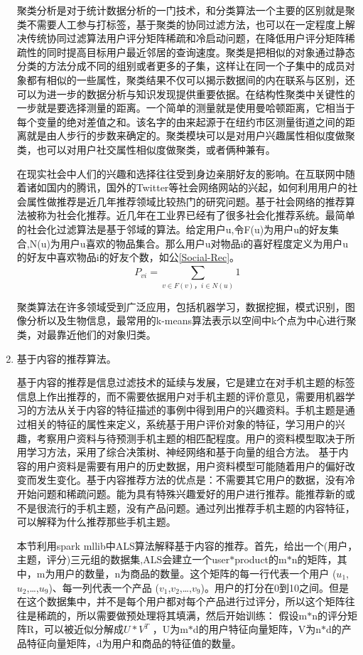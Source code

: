 \begin{enumerate}[(1)]
	聚类分析是对于统计数据分析的一门技术，和分类算法一个主要的区别就是聚类不需要人工参与打标签，基于聚类的协同过滤方法，也可以在一定程度上解决传统协同过滤算法用户评分矩阵稀疏和冷启动问题，在降低用户评分矩阵稀疏性的同时提高目标用户最近邻居的查询速度。聚类是把相似的对象通过静态分类的方法分成不同的组别或者更多的子集，这样让在同一个子集中的成员对象都有相似的一些属性，聚类结果不仅可以揭示数据间的内在联系与区别，还可以为进一步的数据分析与知识发现提供重要依据。在结构性聚类中关键性的一步就是要选择测量的距离。一个简单的测量就是使用曼哈顿距离，它相当于每个变量的绝对差值之和。该名字的由来起源于在纽约市区测量街道之间的距离就是由人步行的步数来确定的。聚类模块可以是对用户兴趣属性相似度做聚类，也可以对用户社交属性相似度做聚类，或者俩种兼有。

	在现实社会中人们的兴趣和选择往往受到身边亲朋好友的影响。在互联网中随着诸如国内的腾讯，国外的Twitter等社会网络网站的兴起，如何利用用户的社会属性做推荐是近几年推荐领域比较热门的研究问题。基于社会网络的推荐算法被称为社会化推荐。近几年在工业界已经有了很多社会化推荐系统。最简单的社会化过滤算法是基于邻域的算法。给定用户u,令F(u)为用户u的好友集合,N(u)为用户u喜欢的物品集合。那么用户u对物品i的喜好程度定义为用户u的好友中喜欢物品i的好友个数，如公\autoref{Social-Rec}。
	\begin{equation}
		P_{vi} = \sum_{v\in F(v)，i\in N(u)}^{} 1
		\label{Social-Rec}
	\end{equation}

	聚类算法在许多领域受到广泛应用，包括机器学习，数据挖掘，模式识别，图像分析以及生物信息，最常用的k-means算法\citep{recmd-kmeans}表示以空间中k个点为中心进行聚类，对最靠近他们的对象归类。
	\item 基于内容的推荐算法。

	基于内容的推荐是信息过滤技术的延续与发展，它是建立在对手机主题的标签信息上作出推荐的，而不需要依据用户对手机主题的评价意见，需要用机器学习的方法从关于内容的特征描述的事例中得到用户的兴趣资料。手机主题是通过相关的特征的属性来定义，系统基于用户评价对象的特征，学习用户的兴趣，考察用户资料与待预测手机主题的相匹配程度。用户的资料模型取决于所用学习方法，采用了综合决策树、神经网络和基于向量的组合方法。 基于内容的用户资料是需要有用户的历史数据，用户资料模型可能随着用户的偏好改变而发生变化。基于内容推荐方法的优点是：不需要其它用户的数据，没有冷开始问题和稀疏问题。能为具有特殊兴趣爱好的用户进行推荐。能推荐新的或不是很流行的手机主题，没有产品问题。通过列出推荐手机主题的内容特征，可以解释为什么推荐那些手机主题。

	本节利用spark mllib中ALS算法解释基于内容的推荐。首先，给出一个(用户，主题，评分)三元组的数据集,ALS会建立一个user$\ast$product的m$\ast$n的矩阵，其中，m为用户的数量，n为商品的数量。这个矩阵的每一行代表一个用户 ($u_1$,$u_2$,…,$u_9$)、每一列代表一个产品 ($v_1$,$v_2$,…,$v_9$)。用户的打分在0到10之间。但是在这个数据集中，并不是每个用户都对每个产品进行过评分，所以这个矩阵往往是稀疏的，所以需要做预处理将其填满，然后开始训练：
    假设m$\ast$n的评分矩阵R，可以被近似分解成$U*V^{T}$ ，U为m$\ast$d的用户特征向量矩阵，V为n$\ast$d的产品特征向量矩阵，d为用户和商品的特征值的数量。


\end{enumerate}
